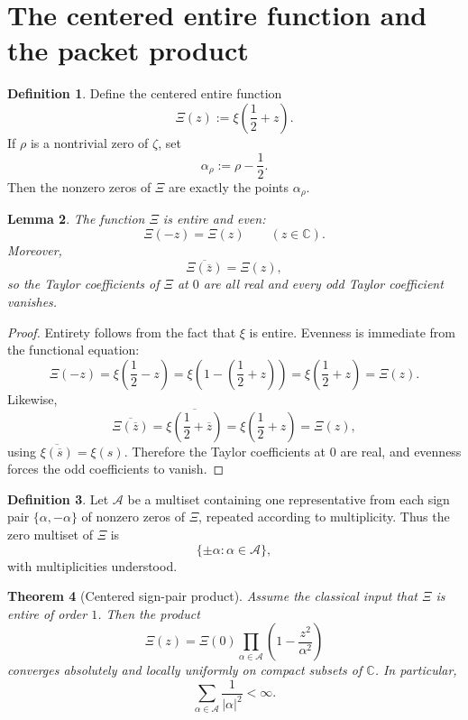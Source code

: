 \documentclass[11pt,a4paper]{article}
\newtheorem{theorem}{Theorem}[section]
\newtheorem{lemma}[theorem]{Lemma}
\theoremstyle{definition}
\newtheorem{definition}[theorem]{Definition}
\theoremstyle{remark}
\newcommand{\CC}{\mathbb C}
\begin{document}
\section{The centered entire function and the packet product}

\begin{definition}
Define the centered entire function
\[
\Xi(z):=\xi\!\left(\frac12+z\right).
\]
If $\rho$ is a nontrivial zero of $\zeta$, set
\[
\alpha_\rho:=\rho-\frac12.
\]
Then the nonzero zeros of $\Xi$ are exactly the points $\alpha_\rho$.
\end{definition}

\begin{lemma}\label{lem:Xi-even-and-real}
The function $\Xi$ is entire and even:
\[
\Xi(-z)=\Xi(z)
\qquad (z\in\CC).
\]
Moreover,
\[
\overline{\Xi(\overline z)}=\Xi(z),
\]
so the Taylor coefficients of $\Xi$ at $0$ are all real and every odd Taylor coefficient vanishes.
\end{lemma}

\begin{proof}
Entirety follows from the fact that $\xi$ is entire.  Evenness is immediate from the functional equation:
\[
\Xi(-z)=\xi\!\left(\frac12-z\right)=\xi\!\left(1-\left(\frac12+z\right)\right)=\xi\!\left(\frac12+z\right)=\Xi(z).
\]
Likewise,
\[
\overline{\Xi(\overline z)}=\overline{\xi\!\left(\frac12+\overline z\right)}=\xi\!\left(\frac12+z\right)=\Xi(z),
\]
using $\overline{\xi(\overline s)}=\xi(s)$.  Therefore the Taylor coefficients at $0$ are real, and evenness forces the odd coefficients to vanish.
\end{proof}

\begin{definition}
Let $\mathcal A$ be a multiset containing one representative from each sign pair $\{\alpha,-\alpha\}$ of nonzero zeros of $\Xi$, repeated according to multiplicity.  Thus the zero multiset of $\Xi$ is
\[
\{\pm\alpha:\alpha\in\mathcal A\},
\]
with multiplicities understood.
\end{definition}

\begin{theorem}[Centered sign-pair product]\label{thm:centered-sign-pair-product}
Assume the classical input that $\Xi$ is entire of order $1$.  Then the product
\begin{equation}\label{eq:Xi-sign-pair-product}
\Xi(z)=\Xi(0)\prod_{\alpha\in\mathcal A}\left(1-\frac{z^2}{\alpha^2}\right)
\end{equation}
converges absolutely and locally uniformly on compact subsets of $\CC$.  In particular,
\[
\sum_{\alpha\in\mathcal A}\frac{1}{|\alpha|^2}<\infty.
\]
\end{theorem}
\end{document}
